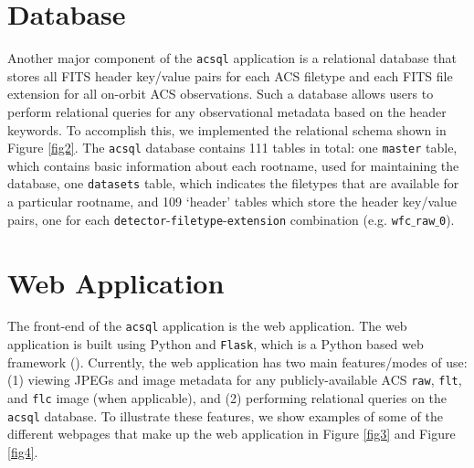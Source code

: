 \documentclass[11pt,twoside]{article}
\begin{document}


\section{Database}

Another major component of the \texttt{acsql} application is a relational database that stores all FITS header key/value pairs for
each ACS filetype and each FITS file extension for all on-orbit ACS observations.  Such a database allows users to perform relational queries for
any observational metadata based on the header keywords.  To accomplish this, we implemented the relational schema shown in Figure \ref{fig2}.
The \texttt{acsql} database contains 111 tables in total: one \texttt{master} table, which contains basic information about each rootname, used for
maintaining the database, one \texttt{datasets} table, which indicates the filetypes that are available for a particular rootname, and 109
`header' tables which store the header key/value pairs, one for each \texttt{detector}-\texttt{filetype}-\texttt{extension} combination
(e.g. \texttt{wfc$\_$raw$\_$0}).



\section{Web Application}

The front-end of the \texttt{acsql} application is the web application.  The web application is built using Python and \texttt{Flask}, which is a
Python based web framework (\citet{Ronacher}).  Currently, the web application has two main features/modes of use: (1) viewing JPEGs and image
metadata for any publicly-available ACS \texttt{raw}, \texttt{flt}, and \texttt{flc} image (when applicable), and (2) performing relational queries
on the \texttt{acsql} database.  To illustrate these features, we show examples of some of the different webpages that make up the web application
in Figure \ref{fig3} and Figure \ref{fig4}.
\end{document}
